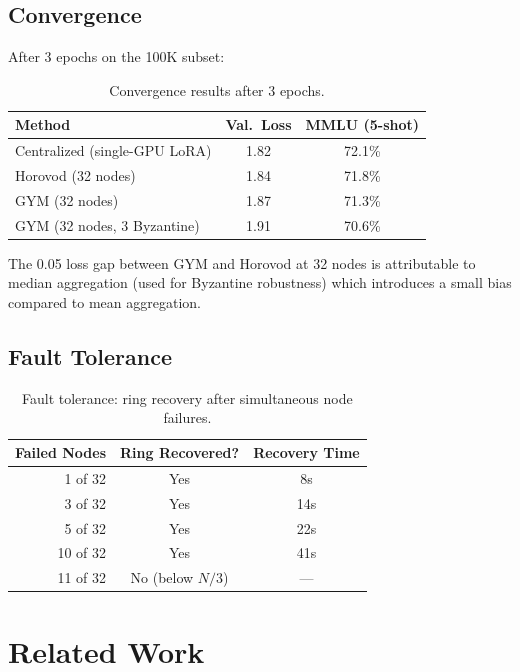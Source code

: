 \documentclass[11pt,letterpaper]{article}
\begin{document}
\subsection{Convergence}

After 3 epochs on the 100K subset:

\begin{table}[t]
\centering
\begin{tabular}{lcc}
\toprule
\textbf{Method} & \textbf{Val.\ Loss} & \textbf{MMLU (5-shot)} \\
\midrule
Centralized (single-GPU LoRA) & 1.82 & 72.1\% \\
Horovod (32 nodes) & 1.84 & 71.8\% \\
GYM (32 nodes) & 1.87 & 71.3\% \\
GYM (32 nodes, 3 Byzantine) & 1.91 & 70.6\% \\
\bottomrule
\end{tabular}
\caption{Convergence results after 3 epochs.}
\label{tab:convergence}
\end{table}

The 0.05 loss gap between GYM and Horovod at 32 nodes is attributable to median aggregation (used for Byzantine robustness) which introduces a small bias compared to mean aggregation.

\subsection{Fault Tolerance}

\begin{table}[t]
\centering
\begin{tabular}{rcc}
\toprule
\textbf{Failed Nodes} & \textbf{Ring Recovered?} & \textbf{Recovery Time} \\
\midrule
1 of 32 & Yes & 8s \\
3 of 32 & Yes & 14s \\
5 of 32 & Yes & 22s \\
10 of 32 & Yes & 41s \\
11 of 32 & No (below $N/3$) & --- \\
\bottomrule
\end{tabular}
\caption{Fault tolerance: ring recovery after simultaneous node failures.}
\label{tab:fault}
\end{table}

\section{Related Work}
\label{sec:related}
\end{document}
